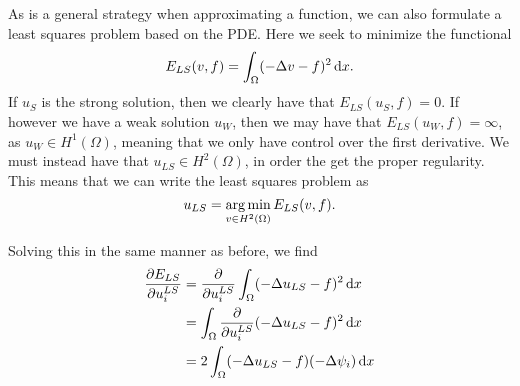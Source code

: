 As is a general strategy when approximating a function, we can also formulate a least squares problem based on the PDE.
Here we seek to minimize the functional
\begin{equation}
    E_{LS}(v, f) = \int_\Omega (-\Delta v - f)^2 \mathop{}\!\mathrm{d} x.
\end{equation}
If $u_S$ is the strong solution, then we clearly have that $E_{LS}(u_S, f) = 0$.
If however we have a weak solution $u_W$, then we may have that $E_{LS}(u_W, f) = \infty$,
as $u_W \in H^1(\Omega)$, meaning that we only have control over the first derivative.
We must instead have that $u_{LS} \in H^2(\Omega)$, in order the get the proper regularity.
This means that we can write the least squares problem as
\begin{equation}
    u_{LS} = \operatorname*{arg\,min}_{v \in H^2(\Omega)} E_{LS}(v, f).
\end{equation}

Solving this in the same manner as before, we find
\begin{align*}
    \frac{\partial E_{LS}}{\partial u_i^{LS}} &= \frac{\partial}{\partial u_i^{LS}} \int_\Omega (-\Delta u_{LS} - f)^2 \mathop{}\!\mathrm{d} x \\
    &= \int_{\Omega} \frac{\partial }{\partial u_i^{LS}} (-\Delta u_{LS} - f)^2 \mathop{}\!\mathrm{d} x \\
    &= 2 \int_{\Omega} (-\Delta u_{LS} - f) (-\Delta \psi_i) \mathop{}\!\mathrm{d} x
\end{align*}